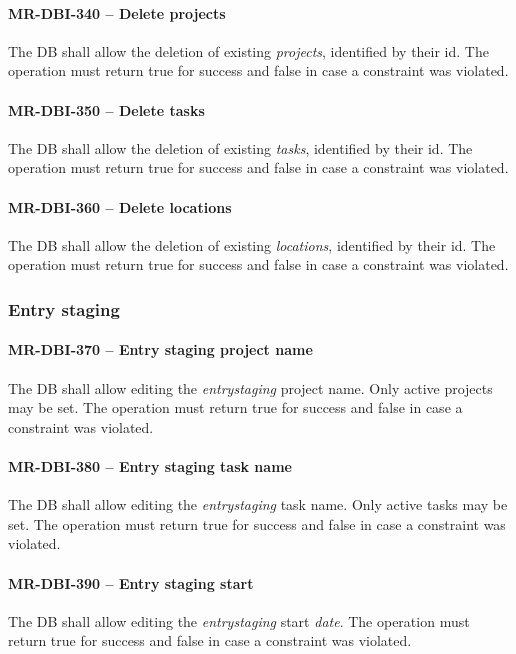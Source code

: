 \paragraph{MR-DBI-340 -- Delete projects}
The \gls{DB} shall allow the deletion of existing \emph{projects},
identified by their id.
The operation must return true for success and false in case a
constraint was violated.

\paragraph{MR-DBI-350 -- Delete tasks}
The \gls{DB} shall allow the deletion of existing \emph{tasks},
identified by their id.
The operation must return true for success and false in case a
constraint was violated.

\paragraph{MR-DBI-360 -- Delete locations}
The \gls{DB} shall allow the deletion of existing \emph{locations},
identified by their id.
The operation must return true for success and false in case a
constraint was violated.

\subsubsection{Entry staging}
\paragraph{MR-DBI-370 -- Entry staging project name}
The \gls{DB} shall allow editing the \emph{entrystaging} project name.
Only active projects may be set.
The operation must return true for success and false in case a
constraint was violated.

\paragraph{MR-DBI-380 -- Entry staging task name}
The \gls{DB} shall allow editing the \emph{entrystaging} task name.
Only active tasks may be set.
The operation must return true for success and false in case a
constraint was violated.

\paragraph{MR-DBI-390 -- Entry staging start}
The \gls{DB} shall allow editing the \emph{entrystaging} start \emph{date}.
The operation must return true for success and false in case a
constraint was violated.

